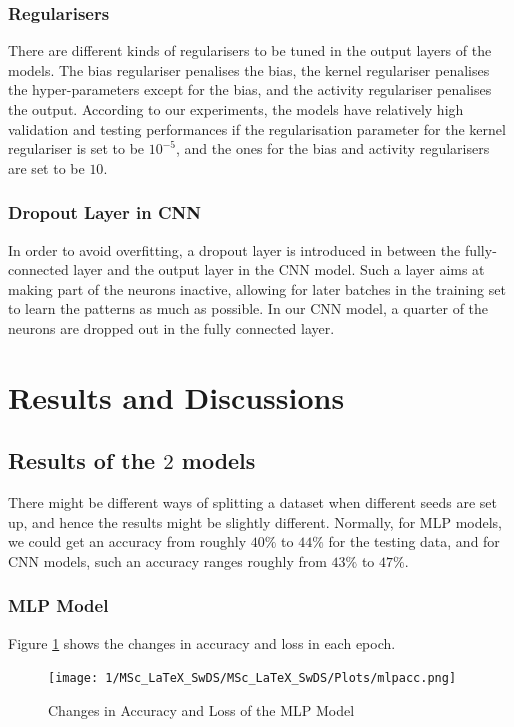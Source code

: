 \documentclass[11pt,twoside]{article}
\numberwithin{Theorem}{section}
\numberwithin{Definition}{section}
\numberwithin{Lemma}{section}
\numberwithin{Algorithm}{section}
\numberwithin{equation}{section}
\begin{document}
\subsubsection{Regularisers}
There are different kinds of regularisers to be tuned in the output layers of the models. The bias regulariser penalises the bias, the kernel regulariser penalises the hyper-parameters except for the bias, and the activity regulariser penalises the output. According to our experiments, the models have relatively high validation and testing performances if the regularisation parameter for the kernel regulariser is set to be $10^{-5}$, and the ones for the bias and activity regularisers are set to be $10$.

\subsubsection{Dropout Layer in CNN}
In order to avoid overfitting, a dropout layer is introduced in between the fully-connected layer and the output layer in the CNN model. Such a layer aims at making part of the neurons inactive, allowing for later batches in the training set to learn the patterns as much as possible. In our CNN model, a quarter of the neurons are dropped out in the fully connected layer.

\section{Results and Discussions}
\label{sec:results}

\subsection{Results of the $2$ models}
There might be different ways of splitting a dataset when different seeds are set up, and hence the results might be slightly different. Normally, for MLP models, we could get an accuracy from roughly $40\%$ to $44\%$ for the testing data, and for CNN models, such an accuracy ranges roughly from $43\%$ to $47\%$.

\subsubsection{MLP Model}

Figure \ref{fig:mlpacc} shows the changes in accuracy and loss in each epoch.

\begin{figure}[h]
\centering
\texttt{[image: 1/MSc\_LaTeX\_SwDS/MSc\_LaTeX\_SwDS/Plots/mlpacc.png]}
\caption{Changes in Accuracy and Loss of the MLP Model}
\label{fig:mlpacc}
\end{figure}
\end{document}
